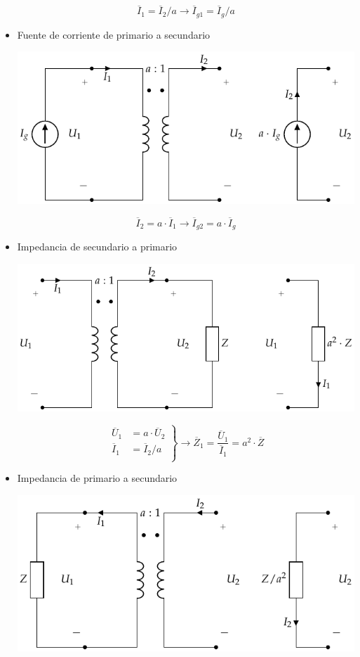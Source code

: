 \begin{itemize}
  \[
    \overline{I}_1 = \overline{I}_2 / a \rightarrow
    \boxed{\overline{I}_{g1} = \overline{I}_g / a}
  \]
\item Fuente de corriente de primario a secundario
  \begin{center}
    \includegraphics[height=.15\textheight]{../figs/TrafoIdeal_IPrim.pdf}
  \end{center}
  \[
    \overline{I}_2 = a \cdot \overline{I}_1 \rightarrow
    \boxed{\overline{I}_{g2} = a \cdot \overline{I}_g}
  \]
\item Impedancia de secundario a primario
  \begin{center}
    \includegraphics[height=.15\textheight]{../figs/TrafoIdeal_ZSec.pdf}
  \end{center}
  \[
    \left.
      \begin{array}{ll}
        \overline{U}_1 &= a \cdot \overline{U}_2\\
        \overline{I}_1 &= \overline{I}_2 / a\\
      \end{array}\right\}
    \rightarrow \boxed{\overline{Z}_1 =
      \frac{\overline{U}_1}{\overline{I}_1} = a^2 \cdot \overline{Z}}
  \]
\item Impedancia de primario a secundario
  \begin{center}
    \includegraphics[height=.15\textheight]{../figs/TrafoIdeal_ZPrim.pdf}

\end{center}
\end{itemize}
